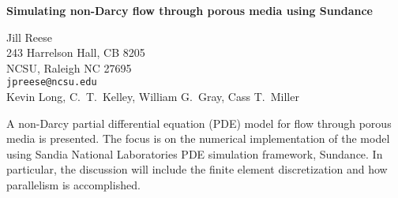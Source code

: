 \documentclass{report}
\begin{document}

\begin{center}
{\large
{\bf Simulating non-Darcy flow through porous media using Sundance}}

	Jill Reese \\
	243 Harrelson Hall, CB 8205 \\
	NCSU, Raleigh NC 27695 \\
	{\tt jpreese@ncsu.edu} \\
	Kevin Long, C.~T.~Kelley, William G.~Gray, Cass T.~Miller
\end{center}
A non-Darcy partial differential equation (PDE) model for
flow through porous media is presented. The focus is on the
numerical implementation of the model using Sandia National
Laboratories PDE simulation framework, Sundance. In
particular, the discussion will include the finite element
discretization and how parallelism is accomplished.



\end{document}

